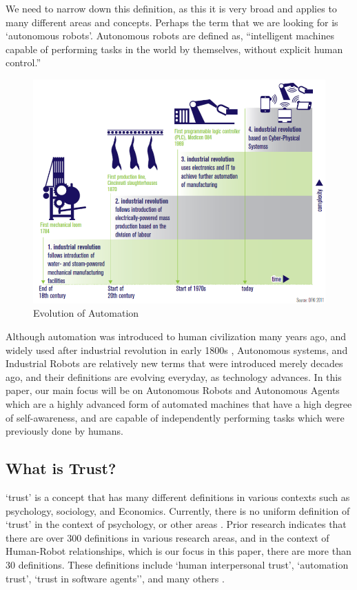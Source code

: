 \documentclass[runningheads,a4paper]{llncs}
\begin{document}
We need to narrow down this definition, as this it is very broad and applies to many different areas and concepts. Perhaps the term that we are looking for is `autonomous robots'. Autonomous robots are defined as, ``intelligent machines capable of performing tasks in the world by themselves, without explicit human control.'' \cite{Bekey:2005:ARB:1088950}

\begin{figure}
	\centering
		\includegraphics[width=\textwidth]{Figures/EvolutionOfAutomation.png}
	\caption{Evolution of Automation \cite{CyberSecurityInIndustry}}
	\label{Trust_Function}
\end{figure}
Although automation was introduced to human civilization many years ago, and widely used after industrial revolution in early 1800s \cite{IndustrialRevolution}, Autonomous systems, and Industrial Robots are relatively new terms that were introduced merely decades ago, and their definitions are evolving everyday, as technology advances. In this paper, our main focus will be on Autonomous Robots and Autonomous Agents which are a highly advanced form of automated machines that have a high degree of self-awareness, and are capable of independently performing tasks which were previously done by humans.

\subsection{What is Trust?}
`trust' is a concept that has many different definitions in various contexts such as psychology, sociology, and Economics. Currently, there is no uniform definition of `trust' in the context of psychology, or other areas \cite{adams2003trust}. Prior research indicates that there are over 300 definitions in various research areas, and in the context of Human-Robot relationships, which is our focus in this paper, there are more than 30 definitions. These definitions include `human interpersonal trust', `automation trust', `trust in software agents'', and many others \cite{schaefer2013perception}. 
\end{document}
